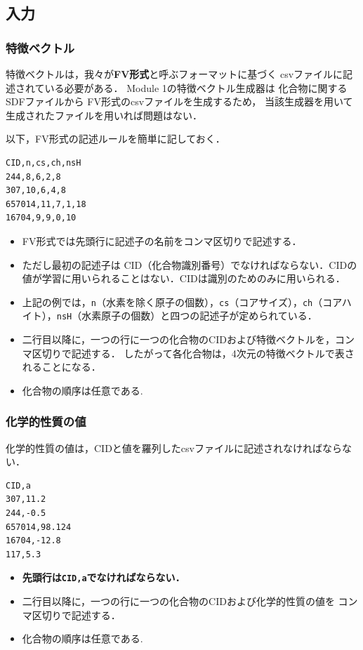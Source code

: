 \documentclass[11pt, titlepage, dvipdfmx, twoside]{jarticle}
\begin{document}
\subsection{入力}
\subsubsection{特徴ベクトル}
特徴ベクトルは，我々が{\bf FV形式}と呼ぶフォーマットに基づく
csvファイルに記述されている必要がある．
Module 1の特徴ベクトル生成器は
化合物に関するSDFファイルから
FV形式のcsvファイルを生成するため，
当該生成器を用いて生成されたファイルを用いれば問題はない．

以下，FV形式の記述ルールを簡単に記しておく．
\begin{oframed}
  {\small
\begin{verbatim}
CID,n,cs,ch,nsH
244,8,6,2,8
307,10,6,4,8
657014,11,7,1,18
16704,9,9,0,10
\end{verbatim}
}
\end{oframed}
\begin{itemize}
\item FV形式では先頭行に記述子の名前をコンマ区切りで記述する．
\item ただし最初の記述子は CID（化合物識別番号）でなければならない．CIDの値が学習に用いられることはない．CIDは識別のためのみに用いられる．
\item 上記の例では，\verb|n|（水素を除く原子の個数），\verb|cs|（コアサイズ），\verb|ch|（コアハイト），\verb|nsH|（水素原子の個数）と四つの記述子が定められている．
\item 二行目以降に，一つの行に一つの化合物のCIDおよび特徴ベクトルを，コンマ区切りで記述する．
  したがって各化合物は，4次元の特徴ベクトルで表されることになる．
\item 化合物の順序は任意である. %
\end{itemize}


\subsubsection{化学的性質の値}
化学的性質の値は，CIDと値を羅列したcsvファイルに記述されなければならない．
\begin{oframed}
  {\small
\begin{verbatim}
CID,a
307,11.2
244,-0.5
657014,98.124
16704,-12.8
117,5.3
\end{verbatim}
}
\end{oframed}
\begin{itemize}
\item {\bf 先頭行は\verb|CID,a|でなければならない．}
\item 二行目以降に，一つの行に一つの化合物のCIDおよび化学的性質の値を
  コンマ区切りで記述する．
\item 化合物の順序は任意である. %
\end{itemize}
  
\end{document}
